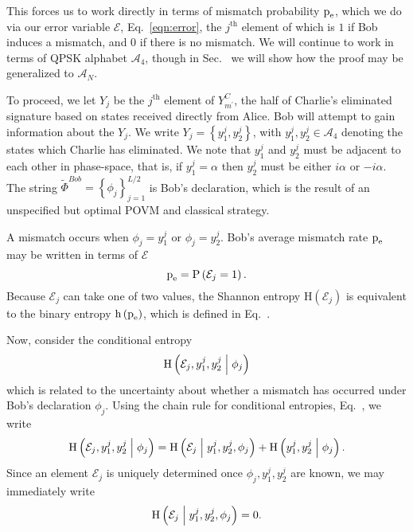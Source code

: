 This forces us to work directly in terms of mismatch probability $\text{p}_{\text{e}}$, which we do via our error variable $\mathcal{E}$, Eq.~\ref{eqn:error}, the $j^{\text{th}}$ element of which is $1$ if Bob induces a mismatch, and $0$ if there is no mismatch. We will continue to work in terms of QPSK alphabet $\mathcal{A}_4$, though in Sec.~ we will show how the proof may be generalized to $\mathcal{A}_N$.

To proceed, we let $Y_j$ be the $j^{\text{th}}$ element of $Y_{m^\prime}^C$, the half of Charlie's eliminated signature based on states received directly from Alice. Bob will attempt to gain information about the $Y_j$. We write $Y_j = \left\{y_1^j, y_2^j\right\}$, with $y_1^j, y_2^j \in \mathcal{A}_4$ denoting the states which Charlie has eliminated. We note that $y_1^j$ and $y_2^j$ must be adjacent to each other in phase-space, that is, if $y_1^j = \alpha$ then $y_2^j$ must be either $i \alpha$ or $- i \alpha$. The string $\tilde{\Phi}^{Bob} = \left\{\phi_j\right\}_{j=1}^{L/2}$ is Bob's declaration, which is the result of an unspecified but optimal POVM and classical strategy.

A mismatch occurs when $\phi_j = y_1^j$ or $\phi_j = y_2^j$. Bob's average mismatch rate $\text{p}_{\text{e}}$ may be written in terms of $\mathcal{E}$
\begin{equation}
\text{p}_{\text{e}} = \text{P}\left(\mathcal{E}_j = 1\right).
\end{equation}
Because $\mathcal{E}_j$ can take one of two values, the Shannon entropy $\text{H}\left(\mathcal{E}_j\right)$ is equivalent to the binary entropy $\text{h}\left(\text{p}_{\text{e}}\right)$, which is defined in Eq.~. %

Now, consider the conditional entropy
\begin{equation}
\text{H}\left(\mathcal{E}_j, y_1^j, y_2^j \; \middle| \; \phi_j\right)
\end{equation}
which is related to the uncertainty about whether a mismatch has occurred under Bob's declaration $\phi_j$. Using the chain rule for conditional entropies, Eq.~, we write
\begin{equation}\label{eqn:qds_pe_deriv_1}
\text{H}\left( \mathcal{E}_j, y_1^j, y_2^j \; \middle| \; \phi_j \right) = 
\text{H}\left( \mathcal{E}_j \; \middle| \; y_1^j, y_2^j, \phi_j\right) + 
\text{H}\left( y_1^j, y_2^j \; \middle| \; \phi_j\right).
\end{equation}
Since an element $\mathcal{E}_j$ is uniquely determined once $\phi_j, y_1^j, y_2^j$ are known, we may immediately write
\begin{equation}
\text{H}\left( \mathcal{E}_j \; \middle| \; y_1^j, y_2^j, \phi_j\right) = 0.
\end{equation}

